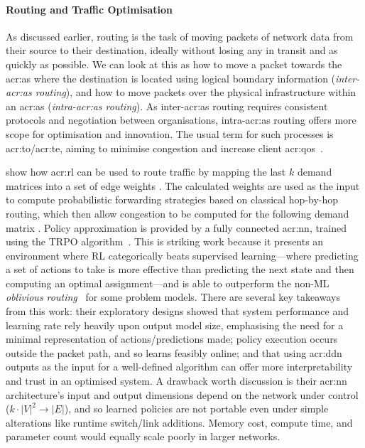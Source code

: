 \paragraph{Routing and Traffic Optimisation}
As discussed earlier, routing is the task of moving packets of network data from their source to their destination, ideally without losing any in transit and as quickly as possible.
We can look at this as how to move a packet towards the \gls{acr:as} where the destination is located using logical boundary information (\emph{inter-\gls{acr:as} routing}), and how to move packets over the physical infrastructure within an \gls{acr:as} (\emph{intra-\gls{acr:as} routing}).
As inter-\gls{acr:as} routing requires consistent protocols and negotiation between organisations, intra-\gls{acr:as} routing offers more scope for optimisation and innovation.
The usual term for such processes is \gls{acr:to}/\gls{acr:te}, aiming to minimise congestion and increase client \gls{acr:qos}~\parencite{rfc3272}.

\textcite{DBLP:conf/hotnets/ValadarskySST17} show how \gls{acr:rl} can be used to route traffic by mapping the last $k$ demand matrices \prllitstate{} into a set of edge weights \prllitactreal.
The calculated weights are used as the input to compute probabilistic forwarding strategies based on classical hop-by-hop routing, which then allow congestion to be computed for the following demand matrix \prllitreward.
Policy approximation is provided by a fully connected \gls{acr:nn}, trained using the TRPO algorithm~\parencite{DBLP:conf/icml/SchulmanLAJM15}.
This is striking work because it presents an environment where RL categorically beats supervised learning---where predicting a set of actions to take is more effective than predicting the next state and then computing an optimal assignment---and is able to outperform the non-ML \emph{oblivious routing}~\parencite{DBLP:conf/stoc/AzarCFKR03} for some problem models.
There are several key takeaways from this work: their exploratory designs showed that system performance and learning rate rely heavily upon output model size, emphasising the need for a minimal representation of actions/predictions made; policy execution occurs outside the packet path, and so learns feasibly online; and that using \gls{acr:ddn} outputs as the input for a well-defined algorithm can offer more interpretability and trust in an optimised system.
A drawback worth discussion is their \gls{acr:nn} architecture's input and output dimensions depend on the network under control ($k\cdot\left|V\right|^2\rightarrow\left|E\right|$), and so learned policies are not portable even under simple alterations like runtime switch/link additions.
Memory cost, compute time, and parameter count would equally scale poorly in larger networks.

